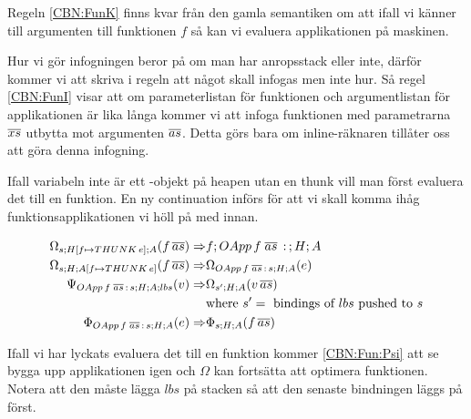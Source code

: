 \documentclass[../Optimise]{subfiles}
\begin{document}
Regeln \eqref{CBN:FunK} finns kvar från den gamla semantiken om att ifall vi känner till
argumenten till funktionen $f$ så kan vi evaluera applikationen på maskinen. 

Hur vi gör infogningen beror på om man har anropsstack eller inte, därför kommer vi
att skriva i regeln att något skall infogas men inte hur. Så regel \eqref{CBN:FunI}
visar att om parameterlistan för funktionen och argumentlistan för applikationen är
lika långa kommer vi att infoga funktionen med parametrarna $\overline{xs}$ utbytta mot
argumenten $\overline{as}$. Detta görs bara om inline-räknaren tillåter oss att göra 
denna infogning.


Ifall variabeln inte är ett -objekt på heapen utan en thunk vill man först evaluera
det till en funktion. En ny continuation  införs för att vi skall komma ihåg
funktionsapplikationen vi höll på med innan.

\begin{align}
\Omega_{s;H[f\mapsto THUNK\,e];A}(f\, \overline{as})  \Rightarrow & f;OApp\,f\;\overline{as}\,:\,;H;A\\
\Omega_{s;H;A[f\mapsto THUNK\,e]}(f\, \overline{as})  \Rightarrow & \Omega_{OApp\,f\;\overline{as}\,:\,s;H;A}(e)\\
\label{CBN:Fun:Psi}\Psi_{OApp\,f\;\overline{as}\,:\,s;H;A;lbs}(v)  \Rightarrow & \Omega_{s';H;A}(v\, \overline{as}) \\
 & \text{where } s' = \text{ bindings of } lbs \text{ pushed to } s \nonumber \\
\label{CBN:Fun:Irr}\Phi_{OApp\,f\;\overline{as}\,:\,s;H;A}(e)  \Rightarrow & \Phi_{s;H;A}(f\, \overline{as})
\end{align}

Ifall vi har lyckats evaluera det till en funktion kommer \eqref{CBN:Fun:Psi} att
se bygga upp applikationen igen och $\Omega$ kan fortsätta att optimera funktionen.
Notera att den måste lägga $lbs$ på stacken så att den senaste bindningen läggs på
först. 
\end{document}
